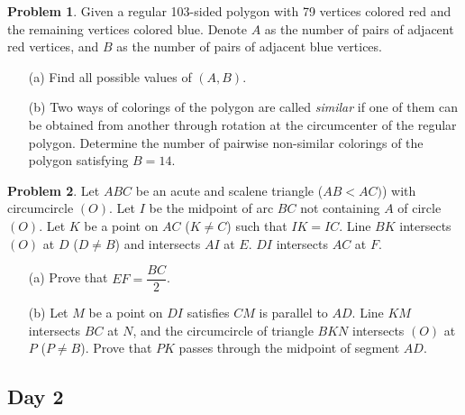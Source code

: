 \documentclass[11pt]{article}
\theoremstyle{definition}
\newtheorem{exercise}{Problem}
\newcommand{\boom}{\vspace{0.25cm}}
\begin{document}
        \begin{exercise}
            Given a regular 103-sided polygon with 79 vertices colored red and the remaining vertices colored blue. Denote \(A\) as the number of pairs of adjacent red vertices, and \(B\) as the number of pairs of adjacent blue vertices.
            \begin{enumerate}
                \item[(a)] Find all possible values of \((A,B)\).
                \item[(b)] Two ways of colorings of the polygon are called \emph{similar} if one of them can be obtained from another through rotation at the circumcenter of the regular polygon. Determine the number of pairwise non-similar colorings of the polygon satisfying \(B = 14\).
            \end{enumerate}
        \end{exercise}
    
        \boom
    
        \begin{exercise}
            Let \(ABC\) be an acute and scalene triangle (\(AB < AC)\)) with circumcircle \((O)\). Let \(I\) be the midpoint of arc \(BC\) not containing \(A\) of circle \((O)\). Let \(K\) be a point on \(AC\) (\(K \neq C\)) such that \(IK = IC\). Line \(BK\) intersects \((O)\) at \(D\) (\(D \neq B\)) and intersects \(AI\) at \(E\). \(DI\) intersects \(AC\) at \(F\).
            \begin{enumerate}
                \item[(a)] Prove that \(EF = \dfrac{BC}{2}\).
                \item[(b)] Let \(M\) be a point on \(DI\) satisfies \(CM\) is parallel to \(AD\). Line \(KM\) intersects \(BC\) at \(N\), and the circumcircle of triangle \(BKN\) intersects \((O)\) at \(P\) (\(P \neq B\)). Prove that \(PK\) passes through the midpoint of segment \(AD\).
            \end{enumerate}
        \end{exercise}

    \newpage
    
    \subsection*{Day 2}
\end{document}
